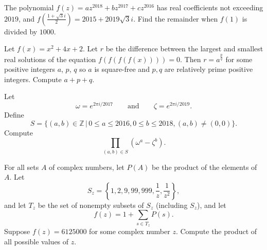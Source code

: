 \documentclass[11pt]{article}
\theoremstyle{definition}
\begin{document}
%	













\begin{question}[name={2019 AIME II, \href{https://artofproblemsolving.com/community/c4p12030059}{Problem 8}}]
	The polynomial $f(z)=az^{2018}+bz^{2017}+cz^{2016}$ has real coefficients not exceeding $2019$, and $f(\tfrac{1+\sqrt{3}i}{2})=2015+2019\sqrt{3}i$. Find the remainder when $f(1)$ is divided by $1000$.	
\end{question}


%	








\begin{question}[name={2019 PUMaC, Algebra, \href{https://artofproblemsolving.com/community/c4p13718042}{Problem 2}}]
	Let $f(x)=x^2+4x+2$. Let $r$ be the difference between the largest and smallest real solutions of the equation $f(f(f(f(x))))=0$. Then $r=a^{\frac{p}{q}}$ for some positive integers $a$, $p$, $q$ so $a$ is square-free and $p,q$ are relatively prime positive integers. Compute $a+p+q$.
\end{question}







\begin{question}[name={2019 PUMaC, Algebra, \href{https://artofproblemsolving.com/community/c4p13718106}{Problem 5}}]
	Let $$\omega=e^{{2\pi i}/{2017}} \qquad \text{and} \qquad \zeta = e^{{2\pi i}/{2019}}.$$ Define $$S=\{(a,b)\in\mathbb{Z}\,|\,0\leq a \leq 2016, 0 \leq b \leq 2018, (a,b)\neq (0,0)\}.$$ Compute
	$$\prod_{(a,b)\in S}(\omega^a-\zeta^b).$$
\end{question}





\begin{question}[name={2019 PUMaC, Team Round, \href{https://artofproblemsolving.com/community/c4p23950991}{Problem 7}}]
	For all sets $A$ of complex numbers, let $P(A)$ be the product of the elements of $A$. Let $$S_z = \left\{1, 2, 9, 99, 999, \frac{1}{z},\frac{1}{z^2}\right\},$$ and let $T_z$ be the set of nonempty subsets of $S_z$ (including $S_z$), and let $$f(z) = 1 + \sum_{s\in T_z} P(s).$$ Suppose $f(z) = 6125000$ for some complex number $z$. Compute the product of all possible values of $z$.	
\end{question}
\end{document}
